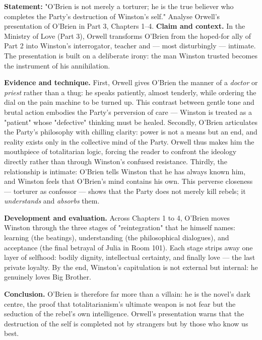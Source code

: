 \documentclass[11pt]{article}
\newcommand{\cle}[1]{{\popxbold\color{popdark}#1}}
\begin{document}
\begin{exoresolu}
\textbf{Statement:} "O'Brien is not merely a torturer; he is the true believer who completes the Party's destruction of Winston's self." Analyse Orwell's presentation of O'Brien in Part 3, Chapters 1--4.
\tcblower
\textbf{Claim and context.} In the Ministry of Love (Part 3), Orwell transforms O'Brien from the hoped-for ally of Part 2 into Winston's interrogator, teacher and — most disturbingly — intimate. The presentation is built on a deliberate \cle{irony}: the man Winston trusted becomes the instrument of his annihilation.

\textbf{Evidence and technique.} First, Orwell gives O'Brien the manner of a \emph{doctor} or \emph{priest} rather than a thug: he speaks patiently, almost tenderly, while ordering the dial on the pain machine to be turned up. This contrast between gentle tone and brutal action embodies the Party's perversion of care — Winston is treated as a "patient" whose "defective" thinking must be healed. Secondly, O'Brien articulates the Party's philosophy with chilling clarity: power is not a means but an end, and reality exists only in the collective mind of the Party. Orwell thus makes him the \cle{mouthpiece of totalitarian logic}, forcing the reader to confront the ideology directly rather than through Winston's confused resistance. Thirdly, the relationship is intimate: O'Brien tells Winston that he has always known him, and Winston feels that O'Brien's mind contains his own. This perverse closeness — torturer as confessor — shows that the Party does not merely kill rebels; it \emph{understands} and \emph{absorbs} them.

\textbf{Development and evaluation.} Across Chapters 1 to 4, O'Brien moves Winston through the three stages of "reintegration" that he himself names: learning (the beatings), understanding (the philosophical dialogues), and acceptance (the final betrayal of Julia in Room 101). Each stage strips away one layer of selfhood: bodily dignity, intellectual certainty, and finally love — the last private loyalty. By the end, Winston's capitulation is not external but internal: he genuinely loves Big Brother.

\textbf{Conclusion.} O'Brien is therefore far more than a villain: he is the novel's dark centre, the proof that totalitarianism's ultimate weapon is not fear but the seduction of the rebel's own intelligence. Orwell's presentation warns that the destruction of the self is completed not by strangers but by those who know us best.
\end{exoresolu}
\end{document}
